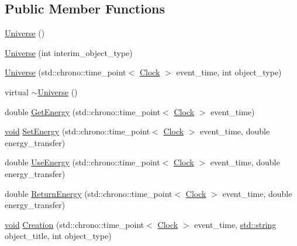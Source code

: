 \subsection*{Public Member Functions}
\begin{DoxyCompactItemize}
\item 
\mbox{\hyperlink{class_universe_a4d137a146dd3c2514dfb692dfbab6984}{Universe}} ()
\item 
\mbox{\hyperlink{class_universe_a1210ce56049f1fc67f53aeda223bb82b}{Universe}} (int interim\+\_\+object\+\_\+type)
\item 
\mbox{\hyperlink{class_universe_a03af7455263d3028b55ca5dc93ebb6ba}{Universe}} (std\+::chrono\+::time\+\_\+point$<$ \mbox{\hyperlink{universe_8h_a0ef8d951d1ca5ab3cfaf7ab4c7a6fd80}{Clock}} $>$ event\+\_\+time, int object\+\_\+type)
\item 
virtual \mbox{\hyperlink{class_universe_ad4d90f6f2727992762c6b409d3d3d228}{$\sim$\+Universe}} ()
\item 
double \mbox{\hyperlink{class_universe_a3b25e7ce6552991b7d5e6a9eb6e8a7ff}{Get\+Energy}} (std\+::chrono\+::time\+\_\+point$<$ \mbox{\hyperlink{universe_8h_a0ef8d951d1ca5ab3cfaf7ab4c7a6fd80}{Clock}} $>$ event\+\_\+time)
\item 
\mbox{\hyperlink{glad_8h_a950fc91edb4504f62f1c577bf4727c29}{void}} \mbox{\hyperlink{class_universe_a868250e67d0fcb2483aa8bdd73c40a02}{Set\+Energy}} (std\+::chrono\+::time\+\_\+point$<$ \mbox{\hyperlink{universe_8h_a0ef8d951d1ca5ab3cfaf7ab4c7a6fd80}{Clock}} $>$ event\+\_\+time, double energy\+\_\+transfer)
\item 
double \mbox{\hyperlink{class_universe_a63e878aaf03f1800b255e9a089a72a8b}{Use\+Energy}} (std\+::chrono\+::time\+\_\+point$<$ \mbox{\hyperlink{universe_8h_a0ef8d951d1ca5ab3cfaf7ab4c7a6fd80}{Clock}} $>$ event\+\_\+time, double energy\+\_\+transfer)
\item 
double \mbox{\hyperlink{class_universe_aeda74e3902c0e56c0c09779854045cde}{Return\+Energy}} (std\+::chrono\+::time\+\_\+point$<$ \mbox{\hyperlink{universe_8h_a0ef8d951d1ca5ab3cfaf7ab4c7a6fd80}{Clock}} $>$ event\+\_\+time, double energy\+\_\+transfer)
\item 
\mbox{\hyperlink{glad_8h_a950fc91edb4504f62f1c577bf4727c29}{void}} \mbox{\hyperlink{class_universe_a28615baf47d4558cbe5eebeed6575024}{Creation}} (std\+::chrono\+::time\+\_\+point$<$ \mbox{\hyperlink{universe_8h_a0ef8d951d1ca5ab3cfaf7ab4c7a6fd80}{Clock}} $>$ event\+\_\+time, \mbox{\hyperlink{glad_8h_ae84541b4f3d8e1ea24ec0f466a8c568b}{std\+::string}} object\+\_\+title, int object\+\_\+type)

\end{DoxyCompactItemize}
